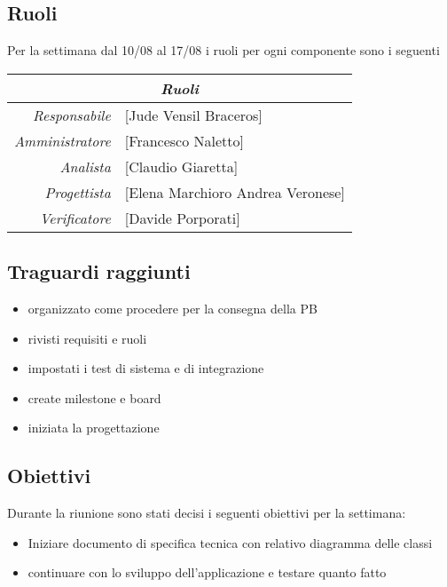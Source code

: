 \documentclass[12pt]{article}
\begin{document}
\subsection{Ruoli}
Per la settimana dal 10/08 al 17/08 i ruoli per ogni componente sono i seguenti
\\
\begin{tabular}{r | l}
    \multicolumn{2}{c}{\textit{Ruoli}}\\
    \hline
    \textit{Responsabile} &
    [Jude Vensil Braceros]\makecell{}\\
    \textit{Amministratore} &
    [Francesco Naletto]\makecell{}\\
    \textit{Analista} &
    [Claudio Giaretta]\makecell{}\\
    \textit{Progettista} &
    [Elena Marchioro Andrea Veronese]\makecell{}\\
    \textit{Verificatore} & 
    [Davide Porporati]\makecell{}\\
\end{tabular}

\subsection{Traguardi raggiunti}
\begin{itemize}
    \item organizzato come procedere per la consegna della PB
    \item rivisti requisiti e ruoli
    \item impostati i test di sistema e di integrazione
    \item create milestone e board
    \item iniziata la progettazione
    
    
\end{itemize}

\subsection{Obiettivi}
Durante la riunione sono stati decisi i seguenti obiettivi per la settimana:
\begin{itemize}
    \item Iniziare documento di specifica tecnica con relativo diagramma delle classi
    \item continuare con lo sviluppo dell'applicazione e testare quanto fatto
    

\end{itemize}
\end{document}
